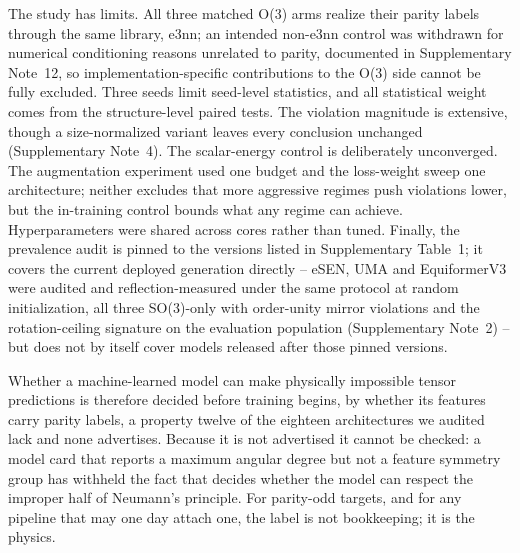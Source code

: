 The study has limits. All three matched O(3) arms realize their parity labels through the same library, e3nn\cite{geiger2022e3nn}; an intended non-e3nn control was withdrawn for numerical conditioning reasons unrelated to parity, documented in Supplementary Note~12, so implementation-specific contributions to the O(3) side cannot be fully excluded. Three seeds limit seed-level statistics, and all statistical weight comes from the structure-level paired tests. The violation magnitude is extensive, though a size-normalized variant leaves every conclusion unchanged (Supplementary Note~4). The scalar-energy control is deliberately unconverged. The augmentation experiment used one budget and the loss-weight sweep one architecture; neither excludes that more aggressive regimes push violations lower, but the in-training control bounds what any regime can achieve. Hyperparameters were shared across cores rather than tuned. Finally, the prevalence audit is pinned to the versions listed in Supplementary Table~1; it covers the current deployed generation directly -- eSEN, UMA and EquiformerV3 were audited and reflection-measured under the same protocol at random initialization, all three SO(3)-only with order-unity mirror violations and the rotation-ceiling signature on the evaluation population (Supplementary Note~2) -- but does not by itself cover models released after those pinned versions.

Whether a machine-learned model can make physically impossible tensor predictions is therefore decided before training begins, by whether its features carry parity labels, a property twelve of the eighteen architectures we audited lack and none advertises. Because it is not advertised it cannot be checked: a model card that reports a maximum angular degree but not a feature symmetry group has withheld the fact that decides whether the model can respect the improper half of Neumann's principle. For parity-odd targets, and for any pipeline that may one day attach one, the label is not bookkeeping; it is the physics.
